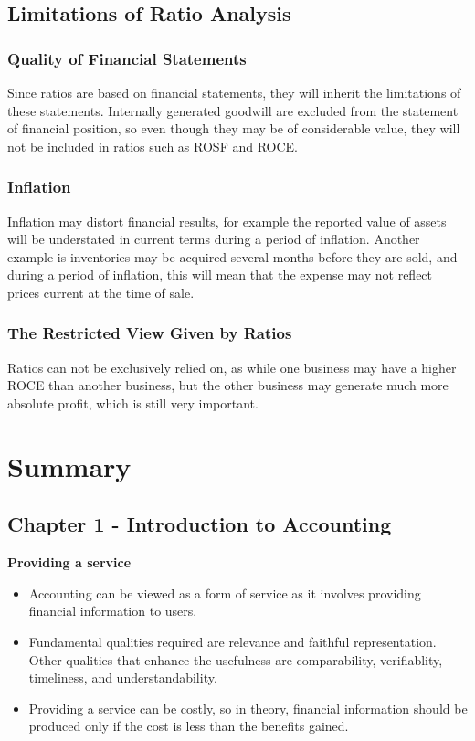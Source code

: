 \documentclass{report}
\begin{document}
\section{Limitations of Ratio Analysis}

\subsection{Quality of Financial Statements}
Since ratios are based on financial statements, they will inherit the limitations of these statements. Internally generated goodwill are excluded from the statement of financial position, so even though they may be of considerable value, they will not be included in ratios such as ROSF and ROCE.

\subsection{Inflation}
Inflation may distort financial results, for example the reported value of assets will be understated in current terms during a period of inflation. Another example is inventories may be acquired several months before they are sold, and during a period of inflation, this will mean that the expense may not reflect prices current at the time of sale.

\subsection{The Restricted View Given by Ratios}
Ratios can not be exclusively relied on, as while one business may have a higher ROCE than another business, but the other business may generate much more absolute profit, which is still very important.

\chapter{Summary}
\section{Chapter 1 - Introduction to Accounting}

\textbf{Providing a service}
\begin{itemize}
    \item Accounting can be viewed as a form of service as it involves providing financial information to users.
    \item Fundamental qualities required are relevance and faithful representation. Other qualities that enhance the usefulness are comparability, verifiablity, timeliness, and understandability.
    \item Providing a service can be costly, so in theory, financial information should be produced only if the cost is less than the benefits gained.\\
\end{itemize}
\end{document}

